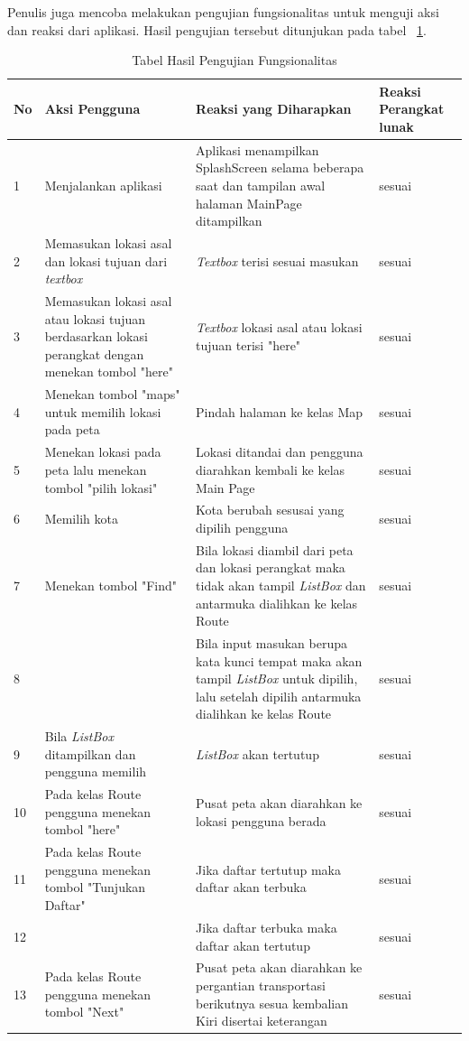 \iffalse
Penulis juga mencoba melakukan pengujian fungsionalitas untuk menguji aksi dan reaksi dari aplikasi. Hasil pengujian tersebut ditunjukan pada tabel ~\ref{tab:TabelHasilPengujianFungsionalitas}.
\begin{table}[h!]
	\centering
		\begin{tabular}{|p{1cm}|p{4cm}|p{6cm}|p{3cm}|}\hline
				No & Aksi Pengguna & Reaksi yang Diharapkan & Reaksi Perangkat lunak \\ \hline
				1 & Menjalankan aplikasi & Aplikasi menampilkan SplashScreen selama beberapa saat dan tampilan awal halaman MainPage ditampilkan & sesuai \\ \hline
				2 & Memasukan lokasi asal dan lokasi tujuan dari \textit{textbox} & \textit{Textbox} terisi sesuai masukan & sesuai \\ \hline
				3 & Memasukan lokasi asal atau lokasi tujuan berdasarkan lokasi perangkat dengan menekan tombol "here" & \textit{Textbox} lokasi asal atau lokasi tujuan terisi "here" & sesuai \\ \hline
				4 & Menekan tombol "maps" untuk memilih lokasi pada peta & Pindah halaman ke kelas Map & sesuai \\ \hline
				5 & Menekan lokasi pada peta lalu menekan tombol "pilih lokasi" & Lokasi ditandai dan pengguna diarahkan kembali ke kelas Main Page & sesuai \\ \hline
				6 & Memilih kota & Kota berubah sesusai yang dipilih pengguna & sesuai \\ \hline
				7 & Menekan tombol "Find" & Bila lokasi diambil dari peta dan lokasi perangkat maka tidak akan tampil \textit{ListBox} dan antarmuka dialihkan ke kelas Route & sesuai \\ \hline
				8 & & Bila input masukan berupa kata kunci tempat maka akan tampil \textit{ListBox} untuk dipilih, lalu setelah dipilih antarmuka dialihkan ke kelas Route & sesuai \\ \hline
				9 & Bila \textit{ListBox} ditampilkan dan pengguna memilih & \textit{ListBox} akan tertutup & sesuai \\ \hline
				10 & Pada kelas Route pengguna menekan tombol "here" & Pusat peta akan diarahkan ke lokasi pengguna berada & sesuai \\ \hline
				11 & Pada kelas Route pengguna menekan tombol "Tunjukan Daftar" & Jika daftar tertutup maka daftar akan terbuka & sesuai \\ \hline
				12 & & Jika daftar terbuka maka daftar akan tertutup & sesuai \\ \hline
				13 & Pada kelas Route pengguna menekan tombol "Next" & Pusat peta akan diarahkan ke pergantian transportasi berikutnya sesua kembalian Kiri disertai keterangan & sesuai \\ \hline
		\end{tabular}
	\caption{Tabel Hasil Pengujian Fungsionalitas}
	\label{tab:TabelHasilPengujianFungsionalitas}
\end{table}

